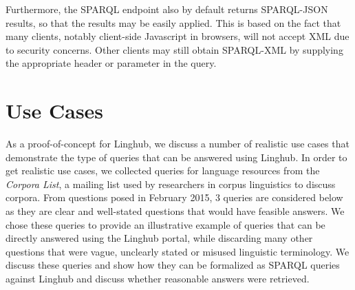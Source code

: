 \documentclass{acm_proc_article-sp}
\begin{document}
Furthermore, the SPARQL endpoint also by default returns SPARQL-JSON
results\cite{seaborne2013sparql}, so that the results may be easily applied. This is based on the
fact that many clients, notably client-side Javascript in browsers, will not
accept XML due to security concerns. Other clients may still obtain SPARQL-XML
by supplying the appropriate header or parameter in the query.

\section{Use Cases}

\label{sec:usecases}

As a proof-of-concept for Linghub, we discuss a number of realistic use cases
that demonstrate the type of queries that can be answered using Linghub. In
order to get realistic use cases, we collected queries for language resources
from the \emph{Corpora List}, a mailing list used by researchers in corpus
linguistics to discuss corpora. From questions posed in February 2015, 3 queries 
are considered below as they are clear and well-stated questions that would have
feasible answers. We chose these queries to provide an illustrative example of
queries that can be directly answered using the Linghub portal, while discarding
many other questions that were vague, unclearly stated or misused linguistic
terminology.
We discuss these queries and show how they can be formalized as
SPARQL queries against Linghub and discuss whether reasonable answers were
retrieved.
\end{document}
